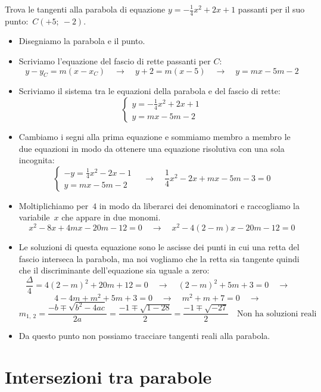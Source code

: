 \begin{esempio}
 Trova le tangenti alla parabola di equazione $y=-\frac{1}{4}x^2+2x +1$ 
 passanti per il suo punto:~$C(+5;~-2)$.
 
 \begin{itemize}
  \item Disegniamo la parabola e il punto.
  \item Scriviamo l'equazione del fascio di rette passanti per $C$:
\[y-y_C = m(x-x_C) \quad \rightarrow \quad 
y+2 = m\left(x-5\right)
\quad \rightarrow \quad y=mx-5m-2\]
  \item Scriviamo il sistema tra le equazioni della parabola e del fascio di 
   rette:
\[\left\{\begin{array}{l}
  y=-\frac{1}{4}x^2+2x +1\\
  y=mx-5m-2
\end{array}\right. \]
  \item Cambiamo i segni alla prima equazione e sommiamo membro a membro le
   due equazioni in modo da ottenere una equazione risolutiva con una sola 
   incognita:
\[\left\{\begin{array}{l}
  -y=\frac{1}{4}x^2-2x-1\\
  y=mx-5m-2
\end{array}\right. \quad \rightarrow \quad 
\frac{1}{4}x^2-2x+mx-5m-3=0\]
  \item Moltiplichiamo per~$4$ in modo da liberarci dei denominatori e 
   raccogliamo la variabile~$x$ che appare in due monomi.
\[x^2-8x+4mx-20m-12=0 \quad \rightarrow \quad x^2-4(2-m)x-20m-12=0\]
  \item Le soluzioni di questa equazione sono le ascisse dei punti in cui una 
   retta del fascio interseca la parabola, ma noi vogliamo che la retta sia
   tangente quindi che il discriminante dell'equazione sia uguale a zero:
\[\frac{\Delta}{4}=4(2-m)^2+20m+12=0 \quad \rightarrow \quad 
(2-m)^2+5m+3=0 \quad \rightarrow \quad\]
\[4-4m+m^2+5m+3=0 \quad \rightarrow \quad
m^2+m+7=0 \quad \rightarrow \quad\]
\[m_{1,~2}=\frac{-b \mp \sqrt{b^2-4ac}}{2a}=\frac{-1 \mp \sqrt{1-28}}{2}=
\frac{-1 \mp \sqrt{-27}}{2} \quad \text{Non ha soluzioni reali}\]
  \item Da questo punto non possiamo tracciare tangenti reali alla
   parabola.
 \end{itemize}
\end{esempio}


\section{Intersezioni tra parabole}
\label{sec:parabola_intersezioniparabole}

